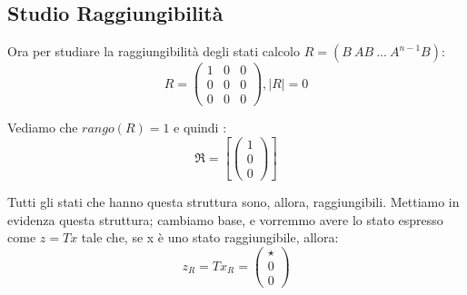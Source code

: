 \documentclass{article}
\begin{document}
\subsection{Studio Raggiungibilità}
Ora per studiare la raggiungibilità degli stati calcolo $R = (B\ AB\ ...\ A^{n-1}B)$: \[ R = \left(\begin{matrix}1 & 0 & 0\\0 & 0 & 0\\0 & 0 & 0\end{matrix}\right), |R| = 0 \] 

Vediamo che $rango(R) = 1$ e quindi : \[ \mathfrak{R} = \left[ \left(\begin{matrix}1\\0\\0\end{matrix}\right)\right] \]

Tutti gli stati che hanno questa struttura sono, allora, raggiungibili. Mettiamo in evidenza questa struttura;
cambiamo base, e vorremmo avere lo stato espresso come $z = Tx$ tale che, se x è uno stato raggiungibile, allora: \[ z_R = T x_R = \begin{pmatrix} \star  \\ 0 \\0\end{pmatrix}\]
\end{document}
